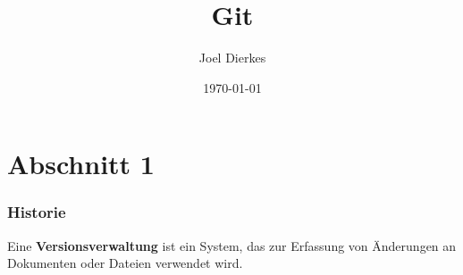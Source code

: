 \documentclass{beamer}
\title{Git}
\author{Joel Dierkes}
\date{\today}
\begin{document}
\maketitle
\frame{\tableofcontents[currentsection]}

\section{Abschnitt 1}
\begin{frame} %
  \frametitle{Historie} %
  \begin{Definition} %
    Eine \textbf{Versionsverwaltung} ist ein System, das zur Erfassung von Änderungen an Dokumenten oder Dateien verwendet wird.
  \end{Definition}
\end{frame}
\end{document}
